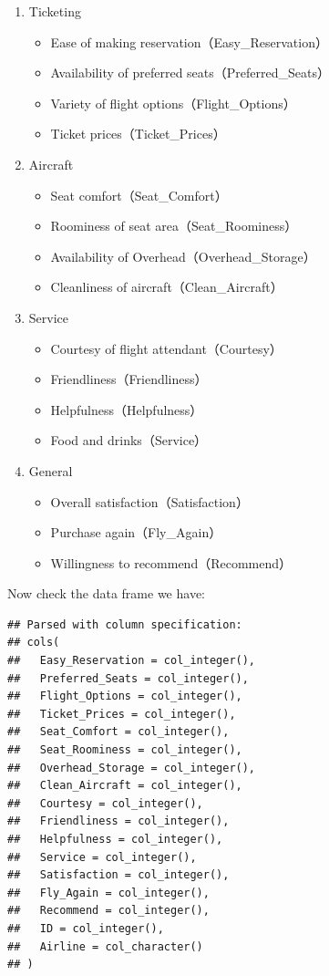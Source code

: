 \documentclass[12pt,]{krantz}
\providecommand{\tightlist}{%
  \setlength{\itemsep}{0pt}\setlength{\parskip}{0pt}}
\theoremstyle{definition}
\theoremstyle{definition}
\theoremstyle{definition}
\theoremstyle{remark}
\begin{document}
\begin{enumerate}
\def\labelenumi{\arabic{enumi}.}
\tightlist
\item
  Ticketing

  \begin{itemize}
  \tightlist
  \item
    Ease of making reservation（Easy\_Reservation）
  \item
    Availability of preferred seats（Preferred\_Seats）
  \item
    Variety of flight options（Flight\_Options）
  \item
    Ticket prices（Ticket\_Prices）
  \end{itemize}
\item
  Aircraft

  \begin{itemize}
  \tightlist
  \item
    Seat comfort（Seat\_Comfort）
  \item
    Roominess of seat area（Seat\_Roominess）
  \item
    Availability of Overhead（Overhead\_Storage）
  \item
    Cleanliness of aircraft（Clean\_Aircraft）
  \end{itemize}
\item
  Service

  \begin{itemize}
  \tightlist
  \item
    Courtesy of flight attendant（Courtesy）
  \item
    Friendliness（Friendliness）
  \item
    Helpfulness（Helpfulness）
  \item
    Food and drinks（Service）
  \end{itemize}
\item
  General

  \begin{itemize}
  \tightlist
  \item
    Overall satisfaction（Satisfaction）
  \item
    Purchase again（Fly\_Again）
  \item
    Willingness to recommend（Recommend）
  \end{itemize}
\end{enumerate}

Now check the data frame we have:

\begin{verbatim}
## Parsed with column specification:
## cols(
##   Easy_Reservation = col_integer(),
##   Preferred_Seats = col_integer(),
##   Flight_Options = col_integer(),
##   Ticket_Prices = col_integer(),
##   Seat_Comfort = col_integer(),
##   Seat_Roominess = col_integer(),
##   Overhead_Storage = col_integer(),
##   Clean_Aircraft = col_integer(),
##   Courtesy = col_integer(),
##   Friendliness = col_integer(),
##   Helpfulness = col_integer(),
##   Service = col_integer(),
##   Satisfaction = col_integer(),
##   Fly_Again = col_integer(),
##   Recommend = col_integer(),
##   ID = col_integer(),
##   Airline = col_character()
## )
\end{verbatim}
\end{document}
